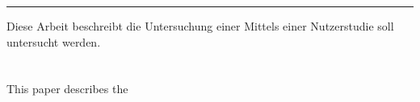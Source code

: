 \documentclass[../../main.tex]{subfiles}
\begin{document}
\begin{onehalfspacing}
\rule{\linewidth}{0.5mm}
Diese Arbeit beschreibt die Untersuchung einer
Mittels einer Nutzerstudie soll untersucht werden.
\\ \\ \\This paper describes the 
\end{onehalfspacing}
\end{document}
